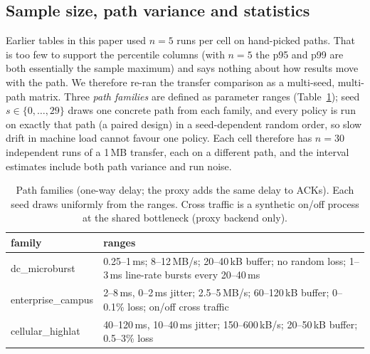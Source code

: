 \providecommand{\texpath}{results/paper_tex}
\providecommand{\inputif}[1]{\IfFileExists{#1}{}{\fbox{missing generated file #1}}}

\subsection{Sample size, path variance and statistics}
\label{sec:scale}
Earlier tables in this paper used $n=5$ runs per cell on hand-picked paths. That is too few to support the percentile columns
(with $n=5$ the p95 and p99 are both essentially the sample maximum) and says nothing about how results move with the path. We therefore
re-ran the transfer comparison as a multi-seed, multi-path matrix. Three \emph{path families} are defined as parameter ranges
(Table~\ref{tab:families}); seed $s\in\{0,\dots,29\}$ draws one concrete path from each family, and every policy is run on exactly that path
(a paired design) in a seed-dependent random order, so slow drift in machine load cannot favour one policy. Each cell therefore has
$n=30$ independent runs of a 1\,MB transfer, each on a different path, and the interval estimates include both path variance and run noise.

\begin{table}[t]\centering\footnotesize
\caption{Path families (one-way delay; the proxy adds the same delay to ACKs). Each seed draws uniformly from the ranges. Cross traffic is a synthetic on/off process at the shared bottleneck (proxy backend only).}
\label{tab:families}
\begin{tabular}{@{}lp{5.6cm}@{}}\toprule
family & ranges\\\midrule
dc\_microburst & 0.25--1\,ms; 8--12\,MB/s; 20--40\,kB buffer; no random loss; 1--3\,ms line-rate bursts every 20--40\,ms\\
enterprise\_campus & 2--8\,ms, 0--2\,ms jitter; 2.5--5\,MB/s; 60--120\,kB buffer; 0--0.1\% loss; on/off cross traffic\\
cellular\_highlat & 40--120\,ms, 10--40\,ms jitter; 150--600\,kB/s; 20--50\,kB buffer; 0.5--3\% loss\\
\bottomrule\end{tabular}
\end{table}

